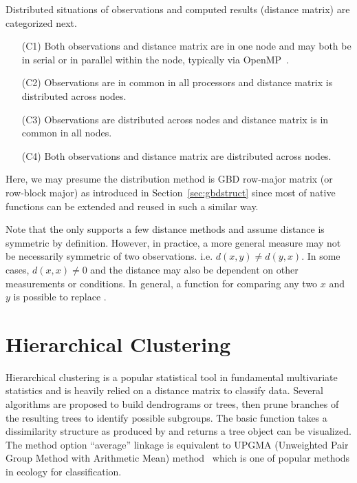 Distributed situations of observations and computed results (distance
matrix) are categorized next.
\begin{itemize}
\item[(C1)]
      Both observations and distance matrix are in one node and may both be
      in serial or in parallel within the node, typically via
      OpenMP~\citep{OpenMP}.
\item[(C2)]
      Observations are in common in all processors
      and distance matrix is distributed across nodes.
\item[(C3)]
      Observations are distributed across nodes
      and distance matrix is in common in all nodes.
\item[(C4)]
      Both observations and distance matrix are distributed
      across nodes.
\end{itemize}
Here, we may presume the distribution method is GBD row-major matrix (or
row-block major) as introduced in Section~\ref{sec:gbdstruct} since most of
native  functions can be extended and reused in such a
similar way.

Note that the  only supports a few distance methods and assume
distance is symmetric by definition. However,
in practice, a more general measure may not be necessarily
symmetric of two observations. i.e. $d(x, y) \neq d(y, x)$.
In some cases, $d(x, x) \neq 0$ and the distance may also be dependent
on other measurements or conditions. In general, a function for comparing
any two $x$ and $y$ is possible to replace .



\section{Hierarchical Clustering}

Hierarchical clustering is a popular statistical tool in fundamental
multivariate statistics and is heavily relied on a distance matrix to classify
data. Several algorithms are proposed to build dendrograms or trees, then
prune branches of the resulting trees to identify possible subgroups.
The basic function 
takes a dissimilarity structure as
produced by  and returns a tree object can be visualized.
The method option ``average'' linkage is equivalent to
UPGMA (Unweighted Pair Group Method with Arithmetic Mean)
method~\citep{Sokal1985} which is one of popular methods in ecology for
classification.

